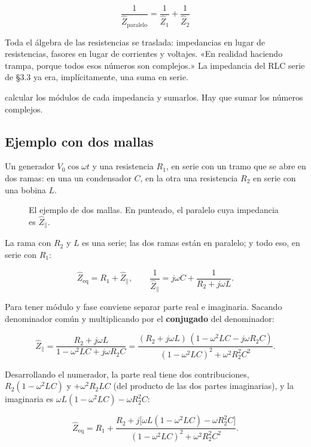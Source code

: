 \documentclass[12pt,a4paper]{article}
\begin{document}
\begin{keybox}
\[
\boxed{\ \frac{1}{{\hat Z}_{\text{paralelo}}} = \frac{1}{\hat Z_1} + \frac{1}{\hat Z_2}\ }
\]
\end{keybox}

Toda el álgebra de las resistencias se traslada: impedancias en lugar de
resistencias, fasores en lugar de corrientes y voltajes. «En realidad haciendo
trampa, porque todos esos números son complejos.» La impedancia del RLC serie
de §3.3 ya era, implícitamente, una suma en serie.

\begin{warnbox}
calcular los módulos de cada impedancia y sumarlos. Hay que
sumar los números complejos.
\end{warnbox}

\subsection{Ejemplo con dos mallas}

Un generador $V_0\cos\omega t$ y una resistencia $R_1$, en serie con un tramo
que se abre en dos ramas: en una un condensador $C$, en la otra una
resistencia $R_2$ en serie con una bobina $L$.

\begin{figure}[H]
  \centering
  
  \caption{El ejemplo de dos mallas. En punteado, el paralelo cuya impedancia es $\hat Z_\parallel$.}
\end{figure}

La rama con $R_2$ y $L$ es una serie; las dos ramas están en paralelo; y todo
eso, en serie con $R_1$:

\[
{\hat Z}_{\text{eq}} = R_1 + \hat Z_\parallel,
\qquad
\frac{1}{\hat Z_\parallel} = j\omega C + \frac{1}{R_2 + j\omega L}.
\]

Para tener módulo y fase conviene separar parte real e imaginaria. Sacando
denominador común y multiplicando por el \textbf{conjugado} del denominador:

\[
\hat Z_\parallel = \frac{R_2 + j\omega L}{1-\omega^2LC + j\omega R_2 C}
= \frac{(R_2 + j\omega L)\,(1-\omega^2LC - j\omega R_2 C)}{(1-\omega^2LC)^2 + \omega^2R_2^2C^2}.
\]

Desarrollando el numerador, la parte real tiene dos contribuciones,
$R_2(1-\omega^2LC)$ y $+\omega^2 R_2 LC$ (del producto de las dos partes
imaginarias), y la imaginaria es $\omega L(1-\omega^2LC) - \omega R_2^2 C$:

\[
{\hat Z}_{\text{eq}} = R_1 + \frac{R_2 + j\big[\omega L(1-\omega^2LC) - \omega R_2^2C\big]}{(1-\omega^2LC)^2 + \omega^2R_2^2C^2}.
\]
\end{document}
